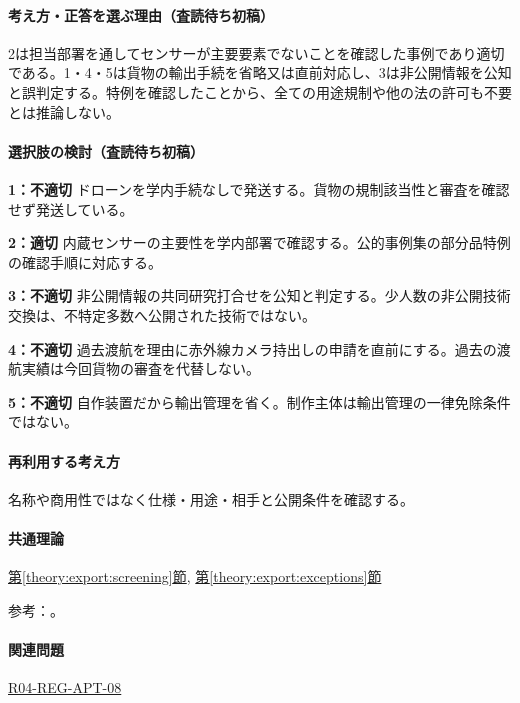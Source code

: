 \paragraph{考え方・正答を選ぶ理由（査読待ち初稿）} 2は担当部署を通してセンサーが主要要素でないことを確認した事例であり適切である。1・4・5は貨物の輸出手続を省略又は直前対応し、3は非公開情報を公知と誤判定する。特例を確認したことから、全ての用途規制や他の法の許可も不要とは推論しない。

\paragraph{選択肢の検討（査読待ち初稿）}\mbox{}\par

\noindent\textbf{1：不適切} ドローンを学内手続なしで発送する。貨物の規制該当性と審査を確認せず発送している。\par

\noindent\textbf{2：適切} 内蔵センサーの主要性を学内部署で確認する。公的事例集の部分品特例の確認手順に対応する。\par

\noindent\textbf{3：不適切} 非公開情報の共同研究打合せを公知と判定する。少人数の非公開技術交換は、不特定多数へ公開された技術ではない。\par

\noindent\textbf{4：不適切} 過去渡航を理由に赤外線カメラ持出しの申請を直前にする。過去の渡航実績は今回貨物の審査を代替しない。\par

\noindent\textbf{5：不適切} 自作装置だから輸出管理を省く。制作主体は輸出管理の一律免除条件ではない。\par

\paragraph{再利用する考え方} 名称や商用性ではなく仕様・用途・相手と公開条件を確認する。

\paragraph{共通理論} \hyperref[theory:export:screening]{第\ref*{theory:export:screening}節}, \hyperref[theory:export:exceptions]{第\ref*{theory:export:exceptions}節}

\par 参考：\cite{export_overview,export_cases}。

\paragraph{関連問題} \hyperref[q:r04-reg-apt-08]{R04-REG-APT-08}


